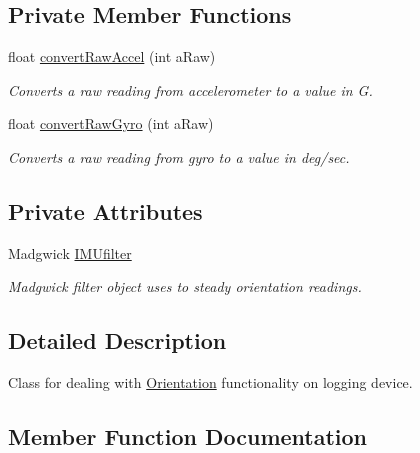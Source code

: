 \subsection*{Private Member Functions}
\begin{DoxyCompactItemize}
\item 
float \hyperlink{class_orientation_ab8a6f65b7f2b43ec5dd09c47fe93fa0b}{convert\+Raw\+Accel} (int a\+Raw)
\begin{DoxyCompactList}\small\item\em Converts a raw reading from accelerometer to a value in G. \end{DoxyCompactList}\item 
float \hyperlink{class_orientation_a99bb5ed3c3226c5d636fa48f26f491dd}{convert\+Raw\+Gyro} (int a\+Raw)
\begin{DoxyCompactList}\small\item\em Converts a raw reading from gyro to a value in deg/sec. \end{DoxyCompactList}\end{DoxyCompactItemize}
\subsection*{Private Attributes}
\begin{DoxyCompactItemize}
\item 
\mbox{\label{class_orientation_a3b0d70328334e69797438ccc408806c1}} 
Madgwick \hyperlink{class_orientation_a3b0d70328334e69797438ccc408806c1}{I\+M\+Ufilter}
\begin{DoxyCompactList}\small\item\em Madgwick filter object uses to steady orientation readings. \end{DoxyCompactList}\end{DoxyCompactItemize}


\subsection{Detailed Description}
Class for dealing with \hyperlink{class_orientation}{Orientation} functionality on logging device. 

\subsection{Member Function Documentation}
\mbox{\label{class_orientation_ab8a6f65b7f2b43ec5dd09c47fe93fa0b}} 

